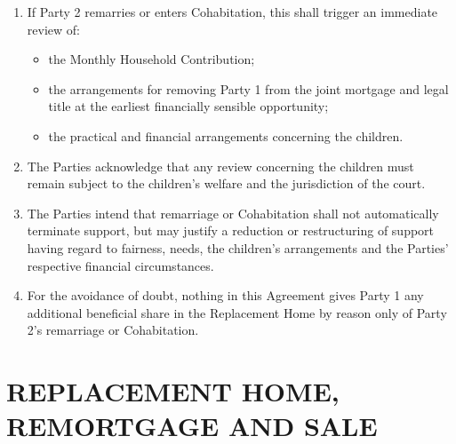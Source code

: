 \documentclass[10pt,a4paper]{article}
\begin{document}
\begin{enumerate}[label=\arabic*., start=44, leftmargin=1.8em]
    \item If Party 2 remarries or enters Cohabitation, this shall trigger an immediate review of:
    \begin{itemize}[leftmargin=1.8em]
        \item the Monthly Household Contribution;
        \item the arrangements for removing Party 1 from the joint mortgage and legal title at the earliest financially sensible opportunity;
        \item the practical and financial arrangements concerning the children.
    \end{itemize}
    \item The Parties acknowledge that any review concerning the children must remain subject to the children's welfare and the jurisdiction of the court.
    \item The Parties intend that remarriage or Cohabitation shall not automatically terminate support, but may justify a reduction or restructuring of support having regard to fairness, needs, the children's arrangements and the Parties' respective financial circumstances.
    \item For the avoidance of doubt, nothing in this Agreement gives Party 1 any additional beneficial share in the Replacement Home by reason only of Party 2's remarriage or Cohabitation.
\end{enumerate}

\section*{REPLACEMENT HOME, REMORTGAGE AND SALE}
\end{document}
